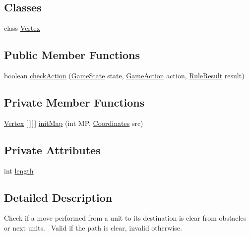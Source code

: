 \subsection*{Classes}
\begin{DoxyCompactItemize}
\item 
class \mbox{\hyperlink{classrule_engine_1_1rules_1_1atomic_rules_1_1_check_is_empty_path_1_1_vertex}{Vertex}}
\end{DoxyCompactItemize}
\subsection*{Public Member Functions}
\begin{DoxyCompactItemize}
\item 
boolean \mbox{\hyperlink{classrule_engine_1_1rules_1_1atomic_rules_1_1_check_is_empty_path_ad24f1d2f183a43c3a71d9716cf6d9413}{check\+Action}} (\mbox{\hyperlink{classgame_1_1game_state_1_1_game_state}{Game\+State}} state, \mbox{\hyperlink{classrule_engine_1_1_game_action}{Game\+Action}} action, \mbox{\hyperlink{classrule_engine_1_1_rule_result}{Rule\+Result}} result)
\end{DoxyCompactItemize}
\subsection*{Private Member Functions}
\begin{DoxyCompactItemize}
\item 
\mbox{\hyperlink{classrule_engine_1_1rules_1_1atomic_rules_1_1_check_is_empty_path_1_1_vertex}{Vertex}} \mbox{[}$\,$\mbox{]}\mbox{[}$\,$\mbox{]} \mbox{\hyperlink{classrule_engine_1_1rules_1_1atomic_rules_1_1_check_is_empty_path_a46778793a7babd4a1ed13ffdf23a3794}{init\+Map}} (int MP, \mbox{\hyperlink{classrule_engine_1_1_coordinates}{Coordinates}} src)
\end{DoxyCompactItemize}
\subsection*{Private Attributes}
\begin{DoxyCompactItemize}
\item 
int \mbox{\hyperlink{classrule_engine_1_1rules_1_1atomic_rules_1_1_check_is_empty_path_a77c893e72c47a75e302041bac3202c46}{length}}
\end{DoxyCompactItemize}


\subsection{Detailed Description}
Check if a move performed from a unit to its destination is clear from obstacles or next units.~\newline
 Valid if the path is clear, invalid otherwise.


